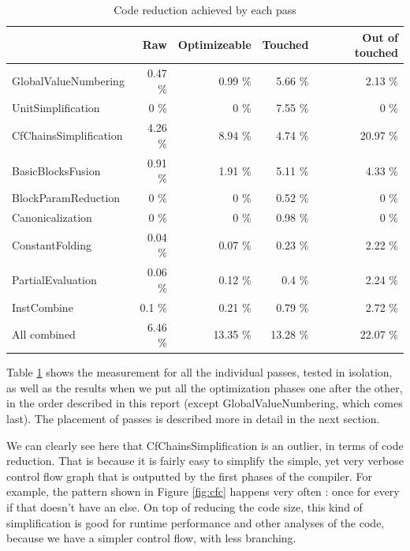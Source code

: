 \documentclass[12pt,a4paper]{article}
\newcommand{\scala}[1]{\textsf{#1}}
\newcommand{\perf}[1]{#1 \%}
\begin{document}
\begin{table}
	\centering
	\begin{tabular}{| l | r | r | r | r |}
\hline
                  & Raw         & Optimizeable & Touched     & Out of touched \\ \hline
GlobalValueNumbering & \perf{0.47} & \perf{0.99}  & \perf{5.66} & \perf{2.13} \\ \hline
UnitSimplification & \perf{0} & \perf{0}  & \perf{7.55} & \perf{0} \\
CfChainsSimplification & \perf{4.26} & \perf{8.94}  & \perf{4.74} & \perf{20.97} \\
BasicBlocksFusion & \perf{0.91} & \perf{1.91}  & \perf{5.11} & \perf{4.33} \\
BlockParamReduction & \perf{0} & \perf{0}  & \perf{0.52} & \perf{0} \\ \hline
Canonicalization & \perf{0} & \perf{0}  & \perf{0.98} & \perf{0} \\
ConstantFolding & \perf{0.04} & \perf{0.07}  & \perf{0.23} & \perf{2.22} \\
PartialEvaluation & \perf{0.06} & \perf{0.12}  & \perf{0.4} & \perf{2.24} \\
InstCombine & \perf{0.1} & \perf{0.21}  & \perf{0.79} & \perf{2.72} \\ \hline
All combined & \perf{6.46} & \perf{13.35}  & \perf{13.28} & \perf{22.07} \\ 
\hline
	\end{tabular}
	\caption{Code reduction achieved by each pass}
	\label{restable}
\end{table}

Table \ref{restable} shows the measurement for all the individual passes, tested in isolation, as well as the results when we put all the optimization phases one after the other, in the order described in this report (except \scala{GlobalValueNumbering}, which comes last). The placement of passes is described more in detail in the next section.

We can clearly see here that \scala{CfChainsSimplification} is an outlier, in terms of code reduction. That is because it is fairly easy to simplify the simple, yet very verbose control flow graph that is outputted by the first phases of the compiler. For example, the pattern shown in Figure \ref{fig:cfc} happens very often : once for every \scala{if} that doesn't have an \scala{else}. On top of reducing the code size, this kind of simplification is good for runtime performance and other analyses of the code, because we have a simpler control flow, with less branching.
\end{document}
